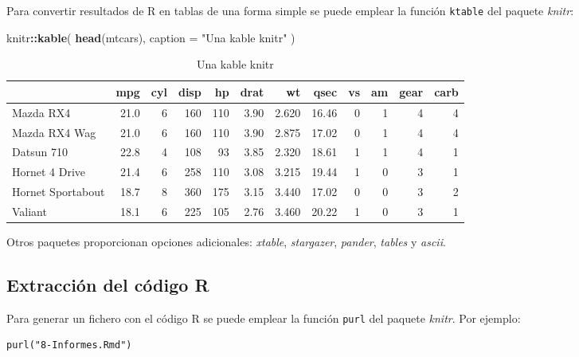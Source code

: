 \documentclass[]{book}
\newenvironment{Shaded}{\begin{snugshade}}{\end{snugshade}}
\newcommand{\DataTypeTok}[1]{\textcolor[rgb]{0.13,0.29,0.53}{#1}}
\newcommand{\KeywordTok}[1]{\textcolor[rgb]{0.13,0.29,0.53}{\textbf{#1}}}
\newcommand{\NormalTok}[1]{#1}
\newcommand{\OperatorTok}[1]{\textcolor[rgb]{0.81,0.36,0.00}{\textbf{#1}}}
\newcommand{\StringTok}[1]{\textcolor[rgb]{0.31,0.60,0.02}{#1}}
\begin{document}
Para convertir resultados de R en tablas de una forma simple se puede emplear la función \texttt{ktable} del paquete \emph{knitr}:

\begin{Shaded}
\begin{Highlighting}[]
\NormalTok{knitr}\OperatorTok{::}\KeywordTok{kable}\NormalTok{(}
  \KeywordTok{head}\NormalTok{(mtcars), }
  \DataTypeTok{caption =} \StringTok{"Una kable knitr"}
\NormalTok{)}
\end{Highlighting}
\end{Shaded}

\begin{table}[t]

\caption{\label{tab:kable}Una kable knitr}
\centering
\begin{tabular}{l|r|r|r|r|r|r|r|r|r|r|r}
\hline
  & mpg & cyl & disp & hp & drat & wt & qsec & vs & am & gear & carb\\
\hline
Mazda RX4 & 21.0 & 6 & 160 & 110 & 3.90 & 2.620 & 16.46 & 0 & 1 & 4 & 4\\
\hline
Mazda RX4 Wag & 21.0 & 6 & 160 & 110 & 3.90 & 2.875 & 17.02 & 0 & 1 & 4 & 4\\
\hline
Datsun 710 & 22.8 & 4 & 108 & 93 & 3.85 & 2.320 & 18.61 & 1 & 1 & 4 & 1\\
\hline
Hornet 4 Drive & 21.4 & 6 & 258 & 110 & 3.08 & 3.215 & 19.44 & 1 & 0 & 3 & 1\\
\hline
Hornet Sportabout & 18.7 & 8 & 360 & 175 & 3.15 & 3.440 & 17.02 & 0 & 0 & 3 & 2\\
\hline
Valiant & 18.1 & 6 & 225 & 105 & 2.76 & 3.460 & 20.22 & 1 & 0 & 3 & 1\\
\hline
\end{tabular}
\end{table}

Otros paquetes proporcionan opciones adicionales: \emph{xtable}, \emph{stargazer}, \emph{pander}, \emph{tables} y \emph{ascii}.

\hypertarget{extraccion-del-codigo-r}{%
\subsection{Extracción del código R}\label{extraccion-del-codigo-r}}

Para generar un fichero con el código R se puede emplear la función \texttt{purl} del paquete \emph{knitr}. Por ejemplo:

\begin{verbatim}
purl("8-Informes.Rmd")
\end{verbatim}
\end{document}
